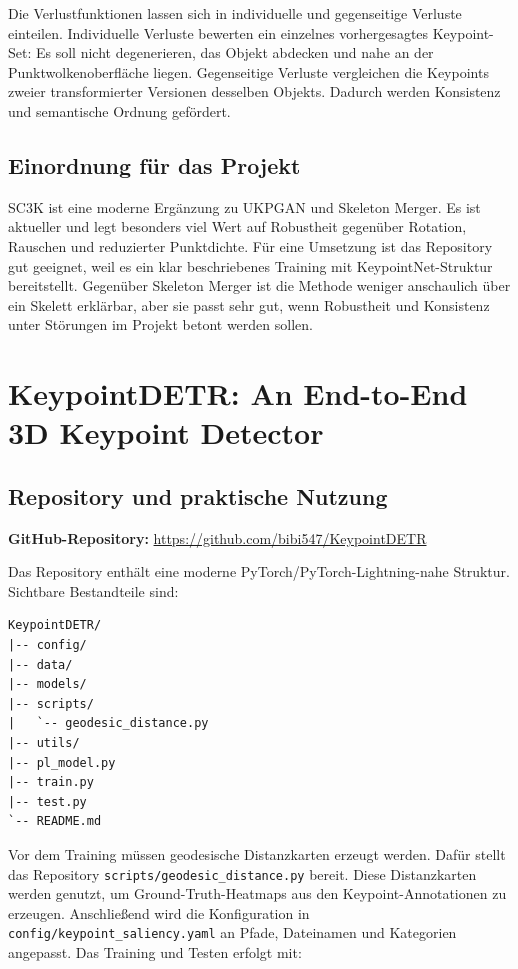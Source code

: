 \documentclass[11pt,a4paper]{article}
\begin{document}
Die Verlustfunktionen lassen sich in individuelle und gegenseitige Verluste einteilen. Individuelle Verluste bewerten ein einzelnes vorhergesagtes Keypoint-Set: Es soll nicht degenerieren, das Objekt abdecken und nahe an der Punktwolkenoberfläche liegen. Gegenseitige Verluste vergleichen die Keypoints zweier transformierter Versionen desselben Objekts. Dadurch werden Konsistenz und semantische Ordnung gefördert.

\subsection{Einordnung für das Projekt}

SC3K ist eine moderne Ergänzung zu UKPGAN und Skeleton Merger. Es ist aktueller und legt besonders viel Wert auf Robustheit gegenüber Rotation, Rauschen und reduzierter Punktdichte. Für eine Umsetzung ist das Repository gut geeignet, weil es ein klar beschriebenes Training mit KeypointNet-Struktur bereitstellt. Gegenüber Skeleton Merger ist die Methode weniger anschaulich über ein Skelett erklärbar, aber sie passt sehr gut, wenn Robustheit und Konsistenz unter Störungen im Projekt betont werden sollen.

\section{KeypointDETR: An End-to-End 3D Keypoint Detector}

\subsection{Repository und praktische Nutzung}

\textbf{GitHub-Repository:} \url{https://github.com/bibi547/KeypointDETR}

Das Repository enthält eine moderne PyTorch/PyTorch-Lightning-nahe Struktur. Sichtbare Bestandteile sind:

\begin{lstlisting}
KeypointDETR/
|-- config/
|-- data/
|-- models/
|-- scripts/
|   `-- geodesic_distance.py
|-- utils/
|-- pl_model.py
|-- train.py
|-- test.py
`-- README.md
\end{lstlisting}

Vor dem Training müssen geodesische Distanzkarten erzeugt werden. Dafür stellt das Repository \texttt{scripts/geodesic\_distance.py} bereit. Diese Distanzkarten werden genutzt, um Ground-Truth-Heatmaps aus den Keypoint-Annotationen zu erzeugen. Anschließend wird die Konfiguration in \texttt{config/keypoint\_saliency.yaml} an Pfade, Dateinamen und Kategorien angepasst. Das Training und Testen erfolgt mit:
\end{document}
